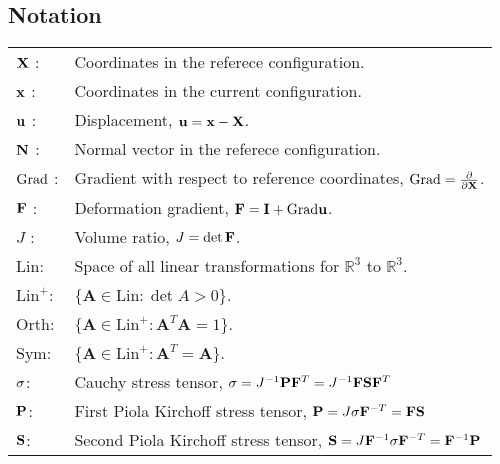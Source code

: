 \newenvironment{notation}%
    {\cleardoublepage\thispagestyle{empty}\null\vfill\begin{center}%
    \chapter*{Notation}\end{center}}%
    {\vfill\null}
        \begin{notation}
      
\begin{longtable}{ll}
  
  $\mathbf{X}$ :& Coordinates in the referece configuration. \\
  $\mathbf{x}$ :& Coordinates in the current configuration. \\
  $\mathbf{u}$ :& Displacement, $\mathbf{u} = \mathbf{x} - \mathbf{X}$. \\
  $\mathbf{N}$ :& Normal vector in the referece configuration. \\
  $\mathrm{Grad}$ :& Gradient with respect to reference coordinates, $\mathrm{Grad} = \frac{\partial}{\partial \mathbf{X}}$. \\
  $\mathbf{F}$ :& Deformation gradient, $\mathbf{F} = \mathbf{I} + \mathrm{Grad} \mathbf{u}$. \\
  $J$ :& Volume ratio, $J = \det \mathbf{F}$. \\
  $\mathrm{Lin}$: & Space of all linear transformations for $\mathbb{R}^3$ to $\mathbb{R}^3$.\\ 
  $\mathrm{Lin}^+$: & $\{ \mathbf{A} \in \mathrm{Lin} : \det A > 0 \}$. \\
  $\mathrm{Orth}$: & $\{ \mathbf{A} \in \mathrm{Lin}^+ : \mathbf{A}^T \mathbf{A} = 1 \}$. \\
  $\mathrm{Sym}$: & $\{ \mathbf{A} \in \mathrm{Lin}^+ : \mathbf{A}^T =  \mathbf{A}  \}$. \\
  $\mathbf{\sigma}$: & Cauchy stress tensor, $\mathbf{\sigma} = J^{-1}\mathbf{P} \mathbf{F}^{T} = J^{-1}\mathbf{F}\mathbf{S} \mathbf{F}^{T}$ \\
  $\mathbf{P}$: & First Piola Kirchoff stress tensor, $\mathbf{P} = J\mathbf{\sigma} \mathbf{F}^{-T} = \mathbf{F} \mathbf{S}$ \\
  $\mathbf{S}$: & Second Piola Kirchoff stress tensor, $\mathbf{S} = J\mathbf{F}^{-1}\mathbf{\sigma} \mathbf{F}^{-T} = \mathbf{F}^{-1} \mathbf{P}$ \\


    
\end{longtable}
\end{notation}